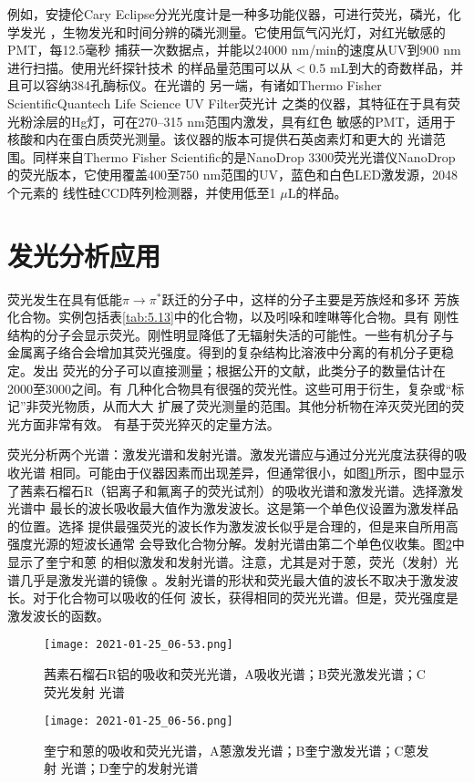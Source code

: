 例如，安捷伦Cary Eclipse分光光度计是一种多功能仪器，可进行荧光，磷光，化学发光
，生物发光和时间分辨的磷光测量。它使用氙气闪光灯，对红光敏感的PMT，每12.5毫秒
捕获一次数据点，并能以24000 nm/min的速度从UV到900 nm进行扫描。使用光纤探针技术
的样品量范围可以从$<$0.5 mL到大的奇数样品，并且可以容纳384孔酶标仪。在光谱的
另一端，有诸如Thermo Fisher ScientificQuantech Life Science UV Filter荧光计
之类的仪器，其特征在于具有荧光粉涂层的Hg灯，可在270--315 nm范围内激发，具有红色
敏感的PMT，适用于核酸和内在蛋白质荧光测量。该仪器的版本可提供石英卤素灯和更大的
光谱范围。同样来自Thermo Fisher Scientific的是NanoDrop 3300荧光光谱仪NanoDrop
的荧光版本，它使用覆盖400至750 nm范围的UV，蓝色和白色LED激发源，2048个元素的
线性硅CCD阵列检测器，并使用低至1 $\mu$L的样品。
\section{发光分析应用}
荧光发生在具有低能$\pi\to\pi^\ast$跃迁的分子中，这样的分子主要是芳族烃和多环
芳族化合物。实例包括表\ref{tab:5.13}中的化合物，以及吲哚和喹啉等化合物。具有
刚性结构的分子会显示荧光。刚性明显降低了无辐射失活的可能性。一些有机分子与
金属离子络合会增加其荧光强度。得到的复杂结构比溶液中分离的有机分子更稳定。发出
荧光的分子可以直接测量；根据公开的文献，此类分子的数量估计在2000至3000之间。有
几种化合物具有很强的荧光性。这些可用于衍生，复杂或“标记”非荧光物质，从而大大
扩展了荧光测量的范围。其他分析物在淬灭荧光团的荧光方面非常有效。
有基于荧光猝灭的定量方法。

荧光分析两个光谱：激发光谱和发射光谱。激发光谱应与通过分光光度法获得的吸收光谱
相同。可能由于仪器因素而出现差异，但通常很小，如图\ref{fig:5.58}所示，图中显示
了茜素石榴石R（铝离子和氟离子的荧光试剂）的吸收光谱和激发光谱。选择激发光谱中
最长的波长吸收最大值作为激发波长。这是第一个单色仪设置为激发样品的位置。选择
提供最强荧光的波长作为激发波长似乎是合理的，但是来自所用高强度光源的短波长通常
会导致化合物分解。发射光谱由第二个单色仪收集。图\ref{fig:5.59}中显示了奎宁和蒽
的相似激发和发射光谱。注意，尤其是对于蒽，荧光（发射）光谱几乎是激发光谱的镜像
。发射光谱的形状和荧光最大值的波长不取决于激发波长。对于化合物可以吸收的任何
波长，获得相同的荧光光谱。但是，荧光强度是激发波长的函数。
\begin{figure}[htpb]
    \centering
    \texttt{[image: 2021-01-25\_06-53.png]}
    \caption{茜素石榴石R铝的吸收和荧光光谱，A吸收光谱；B荧光激发光谱；C荧光发射
    光谱}
    \label{fig:5.58}
\end{figure}
\begin{figure}[htpb]
    \centering
    \texttt{[image: 2021-01-25\_06-56.png]}
    \caption{奎宁和蒽的吸收和荧光光谱，A蒽激发光谱；B奎宁激发光谱；C蒽发射
    光谱；D奎宁的发射光谱}
    \label{fig:5.59}
\end{figure}

